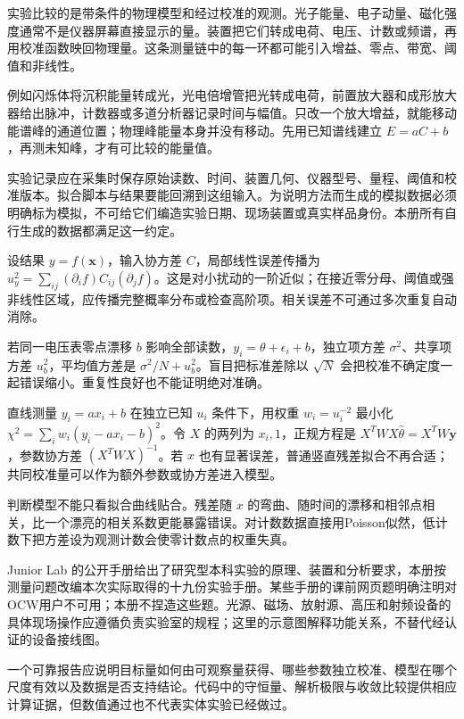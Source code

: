 实验比较的是带条件的物理模型和经过校准的观测。光子能量、电子动量、磁化强度通常不是仪器屏幕直接显示的量。装置把它们转成电荷、电压、计数或频谱，再用校准函数映回物理量。这条测量链中的每一环都可能引入增益、零点、带宽、阈值和非线性。

例如闪烁体将沉积能量转成光，光电倍增管把光转成电荷，前置放大器和成形放大器给出脉冲，计数器或多道分析器记录时间与幅值。只改一个放大增益，就能移动能谱峰的通道位置；物理峰能量本身并没有移动。先用已知谱线建立 $E=aC+b$，再测未知峰，才有可比较的能量值。

实验记录应在采集时保存原始读数、时间、装置几何、仪器型号、量程、阈值和校准版本。拟合脚本与结果要能回溯到这组输入。为说明方法而生成的模拟数据必须明确标为模拟，不可给它们编造实验日期、现场装置或真实样品身份。本册所有自行生成的数据都满足这一约定。

设结果 $y=f(\mathbf x)$，输入协方差 $C$，局部线性误差传播为 $u_y^2=\sum_{ij}(\partial_i f)C_{ij}(\partial_j f)$。这是对小扰动的一阶近似；在接近零分母、阈值或强非线性区域，应传播完整概率分布或检查高阶项。相关误差不可通过多次重复自动消除。

若同一电压表零点漂移 $b$ 影响全部读数，$y_i=\theta+\epsilon_i+b$，独立项方差 $\sigma^2$、共享项方差 $u_b^2$，平均值方差是 $\sigma^2/N+u_b^2$。盲目把标准差除以 $\sqrt N$ 会把校准不确定度一起错误缩小。重复性良好也不能证明绝对准确。

直线测量 $y_i=a x_i+b$ 在独立已知 $u_i$ 条件下，用权重 $w_i=u_i^{-2}$ 最小化 $\chi^2=\sum_iw_i(y_i-a x_i-b)^2$。令 $X$ 的两列为 $x_i,1$，正规方程是 $X^TWX\hat\theta=X^TW\mathbf y$，参数协方差 $(X^TWX)^{-1}$。若 $x$ 也有显著误差，普通竖直残差拟合不再合适；共同校准量可以作为额外参数或协方差进入模型。

判断模型不能只看拟合曲线贴合。残差随 $x$ 的弯曲、随时间的漂移和相邻点相关，比一个漂亮的相关系数更能暴露错误。对计数数据直接用Poisson似然，低计数下把方差设为观测计数会使零计数点的权重失真。

Junior Lab 的公开手册给出了研究型本科实验的原理、装置和分析要求，本册按测量问题改编本次实际取得的十九份实验手册。某些手册的课前网页题明确注明对OCW用户不可用；本册不捏造这些题。光源、磁场、放射源、高压和射频设备的具体现场操作应遵循负责实验室的规程；这里的示意图解释功能关系，不替代经认证的设备接线图。

一个可靠报告应说明目标量如何由可观察量获得、哪些参数独立校准、模型在哪个尺度有效以及数据是否支持结论。代码中的守恒量、解析极限与收敛比较提供相应计算证据，但数值通过也不代表实体实验已经做过。

